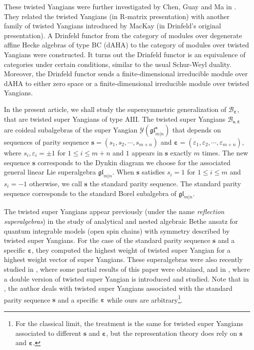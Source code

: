\documentclass[11pt,reqno]{amsart}
\numberwithin{equation}{section}
\theoremstyle{definition}
\theoremstyle{remark}
\newcommand{\gl}{\mathfrak{gl}}
\newcommand{\lle}{\leqslant}
\newcommand{\ve}{\varepsilon}
\newcommand{\s}{{\bm s}}
\begin{document}
These twisted Yangians were further investigated by Chen, Guay and Ma in \cite{Chen2014twisted}. They related the twisted Yangians (in R-matrix presentation) with another family of twisted Yangians introduced by MacKay \cite{MacKay2002rational} (in Drinfeld's original presentation). A Drinfeld functor from the category of modules over degenerate affine Hecke algebras of type BC (dAHA) to the category of modules over twisted Yangians were constructed. It turns out the Drinfeld functor is an equivalence of categories under certain conditions, similar to the usual Schur-Weyl duality. Moreover, the Drinfeld functor sends a finite-dimensional irreducible module over dAHA to either zero space or a finite-dimensional irreducible module over twisted Yangians.

In the present article, we shall study the supersymmetric generalization of $\mathscr B_{\bm\ve}$, that are twisted super Yangians of type AIII. The twisted super Yangians $\mathscr B_{\s,\bm\ve}$ are coideal subalgebras of the super Yangian $\mathscr Y(\gl_{m|n}^\s)$ that depends on sequences of parity sequence $\s=(s_1,s_2,\cdots,s_{m+n})$ and $\bm\ve=(\ve_1,\ve_2,\cdots,\ve_{m+n})$, where $s_i,\ve_i=\pm 1$ for $1\lle i\lle m+n$ and $1$ appears in $\bm s$ exactly $m$ times. The new sequence $\s$ corresponds to the Dynkin diagram we choose for the associated general linear Lie superalgebra $\gl_{m|n}$. When $\s$ satisfies $s_i=1$ for $1\lle i\lle m$ and $s_i=-1$ otherwise, we call $\s$ the standard parity sequence. The standard parity sequence corresponds to the standard Borel subalgebra of $\gl_{m|n}$.

The twisted super Yangians appear previously (under the name \emph{reflection superalgebras}) in the study of analytical and nested algebraic Bethe ansatz \cite{Ragoucy2007analytical,Belliard2009nested} for quantum integrable models (open spin chains) with symmetry described by twisted super Yangians. For the case of the standard parity sequence $\s$ and a specific $\bm\ve$, they computed the highest weight of twisted super Yangian for a highest weight vector of super Yangians. These superalgebras were also recently studied in \cite{kettle2023orthosymplectic}, where some partial results of this paper were obtained, and in \cite{bagnoli2023double}, where a double version of twisted super Yangian is introduced and studied. Note that in \cite{kettle2023orthosymplectic,bagnoli2023double}, the author deals with twisted super Yangians associated with the standard parity sequence $\s$ and a specific $\bm\ve$ while ours are arbitrary\footnote{For the classical limit, the treatment is the same for twisted super Yangians associated to different $\s$ and $\bm\ve$, but the representation theory does rely on $\s$ and $\bm\ve$.}.
\end{document}

